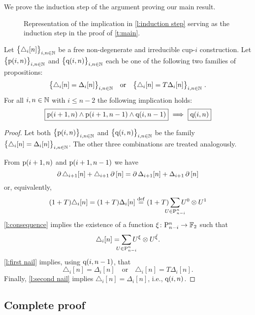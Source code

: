 We prove the induction step of the argument proving our main result.

\begin{figure}
	\centering
	
	\caption{Representation of the implication in \cref{l:induction step} serving as the induction step in the proof of \cref{t:main}.}
	\label{f:induction step}
\end{figure}

\begin{lemma} \label{l:induction step}
	Let $\big\{ \triangle_i [n] \big\}_{i,n\in\mathbb{N}}$ be a free non-degenerate and irreducible \mbox{cup-$i$} construction.
	Let $\big\{ \mathrm{p}(i,n) \big\}_{i,n \in \mathbb{N}}$ and $\big\{ \mathrm{q}(i,n) \big\}_{i,n \in \mathbb{N}}$ each be one of the following two families of propositions:
	\[
	\big\{ \triangle_i [n] = \Delta_ i [n] \big\}_{i,n \in \N}
	\quad \text{or} \quad
	\big\{ \triangle_i [n] = T \Delta_ i [n] \big\}_{i,n \in \N} \ .
	\]
	For all $i,n \in \mathbb{N}$ with $i \leq n-2$ the following implication holds:
	\[
	\boxed{\mathrm{p}(i+1,n) \wedge \mathrm{p}(i+1,n-1) \wedge \mathrm{q}(i,n-1)}\ \Longrightarrow\ \boxed{\mathrm{q}(i,n)}
	\]
\end{lemma}

\begin{proof}
	Let both $\big\{ \mathrm{p}(i,n) \big\}_{i,n\in\mathbb{N}}$ and $\big\{ \mathrm{q}(i,n) \big\}_{i,n\in\mathbb{N}}$ be the family $\big\{ \triangle_i [n] = \Delta_i [n] \big\}_{i,n \in \mathbb{N}}$.
	The other three combinations are treated analogously.

	From $\mathrm{p}(i+1,n)$ and $\mathrm{p}(i+1,n-1)$ we have
	\[
	\operatorname{\partial} \triangle_{i+1} [n] + \triangle_{i+1} \operatorname{\partial} \, [n] =
	\operatorname{\partial} \Delta_{i+1} [n] + \Delta_{i+1} \operatorname{\partial} \, [n]
	\]
	or, equivalently,
	\begin{align*}
	(1+T) \triangle_i [n] =
	(1+T) \Delta_i [n] \defeq
	(1+T) \sum_{\mathclap{U \in \P_{n-i}^n}} {U^0} \ot {U^1}
	\end{align*}
	\cref{l:consequence} implies the existence of a function $\xi \colon \mathrm{P}_{n-i}^n \to {\mathbb{F}_2}$ such that
	\[
	\triangle_i [n] =
	\sum_{\mathclap{U \in \P_{n-i}^n}} U^\xi \ot U^\barxi.
	\]
	\cref{l:first nail} implies, using $\mathrm{q}(i,n-1)$, that
	\[
	\triangle_i [n] = \Delta_i [n]
	\quad \text{or} \quad
	\triangle_i [n] = T \Delta_i [n].
	\]
	Finally, \cref{l:second nail} implies $\triangle_i [n] = \Delta_i [n]$, i.e., $\mathrm{q}(i,n)$.
\end{proof}

\subsection{Complete proof} \label{ss:proof}

